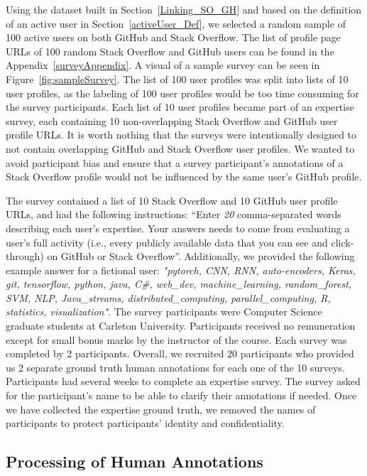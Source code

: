             Using the dataset built in Section~\ref{Linking_SO_GH} and based on the definition of an active user in Section~\ref{activeUser_Def}, we selected a random sample of 100 active users on both GitHub and Stack Overflow. The list of profile page URLs of 100 random Stack Overflow and GitHub users can be found in the Appendix~\ref{surveyAppendix}. A visual of a sample survey can be seen in Figure~\ref{fig:sampleSurvey}. The list of 100 user profiles was split into lists of 10 user profiles, as the labeling of 100 user profiles would be too time consuming for the survey participants. Each list of 10 user profiles became part of an expertise survey, each containing 10 non-overlapping Stack Overflow and GitHub user profile URLs. It is worth nothing that the surveys were intentionally designed to not contain overlapping GitHub and Stack Overflow user profiles. We wanted to avoid participant bias and ensure that a survey participant's annotations of a Stack Overflow profile would not be influenced by the same user's GitHub profile.
            
            The survey contained a list of 10 Stack Overflow and 10 GitHub user profile URLs, and had the following instructions: ``Enter \emph{20} comma-separated words describing each user's expertise. Your answers needs to come from evaluating a user's full activity (i.e., every publicly available data that you can see and click-through) on GitHub or Stack Overflow''. Additionally, we provided the following example answer for a fictional user: \emph{"pytorch, CNN, RNN, auto-encoders, Keras, git, tensorflow, python, java, C\#, web\_dev, machine\_learning, random\_forest, SVM, NLP, Java\_streams, distributed\_computing, parallel\_computing, R, statistics, visualization"}. The survey participants were Computer Science graduate students at Carleton University. Participants received no remuneration except for small bonus marks by the instructor of the course.
            Each survey was completed by 2 participants. Overall, we recruited 20 participants who provided us 2 separate ground truth human annotations for each one of the 10 surveys. Participants had several weeks to complete an expertise survey. The survey asked for the participant's name to be able to clarify their annotations if needed. Once we have collected the expertise ground truth, we removed the names of participants to protect participants' identity and confidentiality.  
        
        \subsection{Processing of Human Annotations}
        
